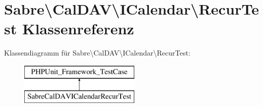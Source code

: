 \hypertarget{class_sabre_1_1_v_object_1_1_property_1_1_i_calendar_1_1_recur_test}{}\section{Sabre\textbackslash{}Cal\+D\+AV\textbackslash{}I\+Calendar\textbackslash{}Recur\+Test Klassenreferenz}
\label{class_sabre_1_1_v_object_1_1_property_1_1_i_calendar_1_1_recur_test}
Klassendiagramm für Sabre\textbackslash{}Cal\+D\+AV\textbackslash{}I\+Calendar\textbackslash{}Recur\+Test\+:\begin{figure}[H]
\begin{center}
\leavevmode
\includegraphics[height=2.000000cm]{class_sabre_1_1_v_object_1_1_property_1_1_i_calendar_1_1_recur_test}
\end{center}
\end{figure}
